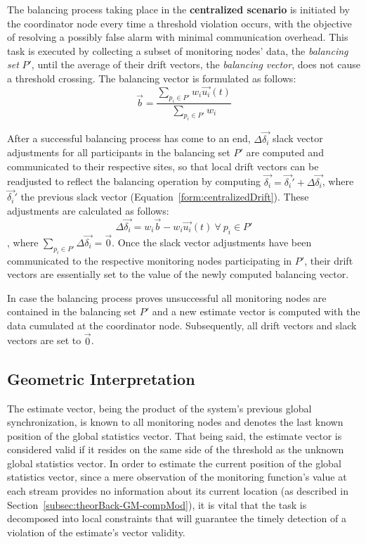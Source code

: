The balancing process taking place in the \textbf{centralized scenario} is initiated by the coordinator node every time a threshold violation occurs, with the objective of resolving a possibly false alarm with minimal communication overhead. This task is executed by collecting a subset of monitoring nodes' data, the \emph{balancing set} $P'$, until the average of their drift vectors, the \emph{balancing vector}, does not cause a threshold crossing. The balancing vector is formulated as follows:
\begin{equation}
\vec{b}=\frac{ \sum_{p_i \in P'} {w_i\vec{u_i}(t)} }{ \sum_{p_i \in P'} {w_i} }
\label{form:balancingVector}
\end{equation}

After a successful balancing process has come to an end, $\Delta\vec{\delta_i}$ slack vector adjustments for all participants in the balancing set $P'$ are computed and communicated to their respective sites, so that local drift vectors can be readjusted to reflect the balancing operation by computing $\vec{\delta_i}=\vec{\delta_i}'+\Delta\vec{\delta_i}$, where $\vec{\delta_i}'$ the previous slack vector (Equation~\ref{form:centralizedDrift}). These adjustments are calculated as follows:
\begin{equation}
\Delta\vec{\delta_i}=w_i\vec{b}-w_i\vec{u_i}(t)\ \forall\ p_i \in P'
\end{equation}
, where $\sum_{p_i \in P'} \Delta \vec{\delta_i}= \vec{0}$. Once the slack vector adjustments have been communicated to the respective monitoring nodes participating in $P'$, their drift vectors are essentially set to the value of the newly computed balancing vector.

In case the balancing process proves unsuccessful all monitoring nodes are contained in the balancing set $P'$ and a new estimate vector is computed with the data cumulated at the coordinator node. Subsequently, all drift vectors and slack vectors are set to $\vec{0}$.

\subsection{Geometric Interpretation} \label{subsec:theorBack-GM-geomInt}

The estimate vector, being the product of the system's previous global synchronization, is known to all monitoring nodes and denotes the last known position of the global statistics vector. That being said, the estimate vector is considered valid if it resides on the same side of the threshold as the unknown global statistics vector.
In order to estimate the current position of the global statistics vector, since a mere observation of the monitoring function's value at each stream provides no information about its current location (as described in Section~\ref{subsec:theorBack-GM-compMod}), it is vital that the task is decomposed into local constraints that will guarantee the timely detection of a violation of the estimate's vector validity.

